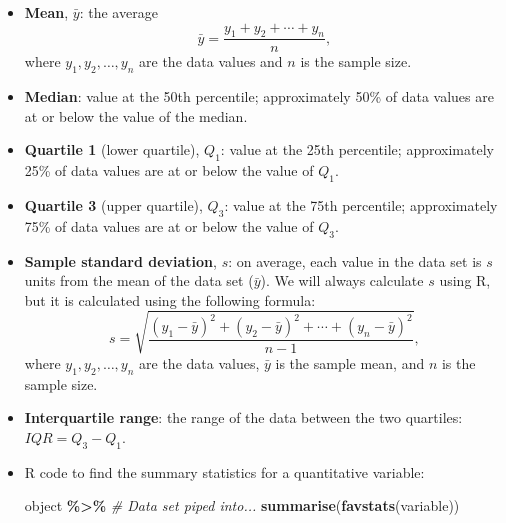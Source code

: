 \documentclass[
]{report}
\newenvironment{Shaded}{\begin{snugshade}}{\end{snugshade}}
\newcommand{\CommentTok}[1]{\textcolor[rgb]{0.56,0.35,0.01}{\textit{#1}}}
\newcommand{\FunctionTok}[1]{\textcolor[rgb]{0.13,0.29,0.53}{\textbf{#1}}}
\newcommand{\NormalTok}[1]{#1}
\newcommand{\SpecialCharTok}[1]{\textcolor[rgb]{0.81,0.36,0.00}{\textbf{#1}}}
\providecommand{\tightlist}{%
  \setlength{\itemsep}{0pt}\setlength{\parskip}{0pt}}
\begin{document}
\begin{itemize}
\item
  \textbf{Mean}, \(\bar{y}\): the average
  \[ 
  \bar{y} = \frac{y_1 + y_2 + \cdots + y_n}{n},
  \]
  where \(y_1, y_2, \ldots, y_n\) are the data values and \(n\) is the sample size.
\item
  \textbf{Median}: value at the 50th percentile; approximately 50\% of data values are at or below the value of the median.
\end{itemize}

\vspace{1mm}

\begin{itemize}
\tightlist
\item
  \textbf{Quartile 1} (lower quartile), \(Q_1\): value at the 25th percentile; approximately 25\% of data values are at or below the value of \(Q_1\).
\end{itemize}

\vspace{1mm}

\begin{itemize}
\tightlist
\item
  \textbf{Quartile 3} (upper quartile), \(Q_3\): value at the 75th percentile; approximately 75\% of data values are at or below the value of \(Q_3\).
\end{itemize}

\newpage

\begin{itemize}
\item
  \textbf{Sample standard deviation}, \(s\): on average, each value in the data set is \(s\) units from the mean of the data set (\(\bar{y}\)). We will always calculate \(s\) using R, but it is calculated using the following formula:
  \[
  s = \sqrt{\frac{(y_1-\bar{y})^2 + (y_2-\bar{y})^2 + \cdots + (y_n-\bar{y})^2}{n-1}},
  \]
  where \(y_1, y_2, \ldots, y_n\) are the data values, \(\bar{y}\) is the sample mean, and \(n\) is the sample size.
\item
  \textbf{Interquartile range}: the range of the data between the two quartiles: \(IQR = Q_3-Q_1\).
\item
  R code to find the summary statistics for a quantitative variable:

\begin{Shaded}
\begin{Highlighting}[]
\NormalTok{object }\SpecialCharTok{\%\textgreater{}\%} \CommentTok{\# Data set piped into...}
    \FunctionTok{summarise}\NormalTok{(}\FunctionTok{favstats}\NormalTok{(variable))}
\end{Highlighting}
\end{Shaded}
\end{itemize}
\end{document}
